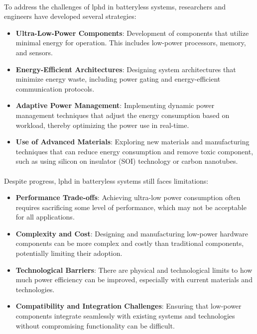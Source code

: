         \paragraph{}
        To address the challenges of \gls{lphd} in batteryless systems, researchers and engineers have developed several strategies:
        \begin{itemize}
            \item \textbf{Ultra-Low-Power Components}: Development of components that utilize minimal energy for operation. This includes low-power processors, memory, and sensors.
            \item \textbf{Energy-Efficient Architectures}: Designing system architectures that minimize energy waste, including power gating and energy-efficient communication protocols.
            \item \textbf{Adaptive Power Management}: Implementing dynamic power management techniques that adjust the energy consumption based on workload, thereby optimizing the power use in real-time.
            \item \textbf{Use of Advanced Materials}: Exploring new materials and manufacturing techniques that can reduce energy consumption and remove toxic component\cite{ecofriendlyManufacturingiot}, such as using silicon on insulator (SOI) technology or carbon nanotubes.
        \end{itemize}

        \paragraph{}
        Despite progress, \gls{lphd} in batteryless systems still faces limitations:
        \begin{itemize}
            \item \textbf{Performance Trade-offs}: Achieving ultra-low power consumption often requires sacrificing some level of performance, which may not be acceptable for all applications.
            \item \textbf{Complexity and Cost}: Designing and manufacturing low-power hardware components can be more complex and costly than traditional components, potentially limiting their adoption.
            \item \textbf{Technological Barriers}: There are physical and technological limits to how much power efficiency can be improved, especially with current materials and technologies.
            \item \textbf{Compatibility and Integration Challenges}: Ensuring that low-power components integrate seamlessly with existing systems and technologies without compromising functionality can be difficult.
        \end{itemize}

